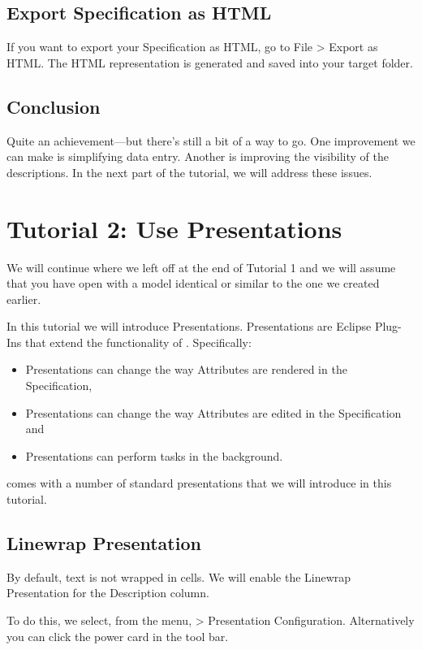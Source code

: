 \subsection{Export Specification as HTML}

If you want to export your Specification as HTML, go to File \textgreater{} Export as HTML.  The HTML representation is generated and saved into your target folder.

\subsection{Conclusion}

Quite an achievement—but there's still a bit of a way to go.  One improvement we can make is simplifying data entry.  Another is improving  the visibility of the descriptions.  In the next part of the tutorial, we will address these issues.

\section{Tutorial 2: Use Presentations}
We will continue where we left off at the end of Tutorial 1 and we will assume that you have \pror{} open with a model identical or similar to the one we created earlier.

In this tutorial we will introduce Presentations.  Presentations are Eclipse Plug-Ins that extend the functionality of \pror{}.  Specifically:

\begin{itemize}
\item
  Presentations can change the way Attributes are rendered in the Specification,
\item
  Presentations can change the way Attributes are edited in the Specification and
\item
  Presentations can perform tasks in the background.
\end{itemize}

\pror{} comes with a number of standard presentations that we will introduce in this tutorial.

\subsection{Linewrap Presentation}

By default, text is not wrapped in cells.  We will enable the Linewrap Presentation for the Description column.

To do this, we select, from the menu,  \pror{} \textgreater{} Presentation Configuration.  Alternatively you can click the power card in the tool bar.

